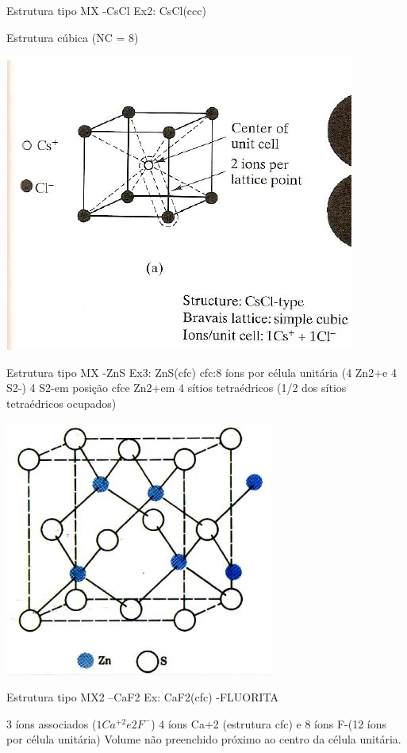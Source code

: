 Estrutura tipo MX -CsCl
Ex2: CsCl(ccc)

Estrutura cúbica (NC = 8)

 \includegraphics[scale=0.2,trim={0 0 0 0}]{figures/CsCl}
 
 

Estrutura tipo MX -ZnS
Ex3: ZnS(cfc)
cfc:8 íons por célula unitária (4 Zn2+e 4 S2-)
4 S2-em posição cfce Zn2+em 4 sítios tetraédricos
(1/2 dos sítios tetraédricos ocupados)

 \includegraphics[scale=0.3,trim={0 0 0 0}]{figures/ZnS}


 Estrutura tipo MX2 –CaF2
 Ex: CaF2(cfc) -FLUORITA
 
3 íons associados ($1Ca^{+2} e 2F^{-}$)
4 íons Ca+2 (estrutura cfc) e 8 íons F-(12 íons por célula unitária)
Volume não preenchido próximo ao centro da célula unitária.

